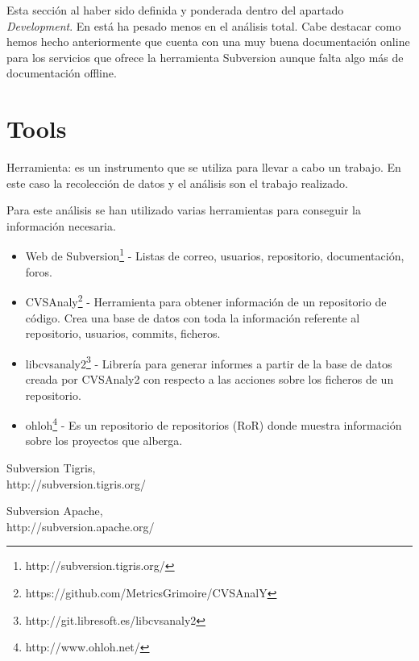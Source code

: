\documentclass[11pt]{scrartcl}
\begin{document}
\par Esta secci\'on al haber sido definida y ponderada dentro del apartado \emph{Development}. En est\'a ha pesado menos en el an\'alisis total. Cabe destacar como hemos hecho anteriormente que cuenta con una muy buena documentaci\'on online para los servicios que ofrece la herramienta Subversion aunque falta algo m\'as de documentaci\'on offline.

\section{Tools}

\par Herramienta: es un instrumento que se utiliza para llevar a cabo un trabajo. En este caso la recolecci\'on de datos y el an\'alisis son el trabajo realizado.

\par Para este an\'alisis se han utilizado varias herramientas para conseguir la informaci\'on necesaria.

\begin{itemize}
    \item Web de Subversion\footnote{http://subversion.tigris.org/} - Listas de correo, usuarios, repositorio, documentaci\'on, foros.
    \item CVSAnaly\footnote{https://github.com/MetricsGrimoire/CVSAnalY} - Herramienta para obtener informaci\'on de un repositorio de c\'odigo. Crea una base de datos con toda la informaci\'on referente al repositorio, usuarios, commits, ficheros.
    \item libcvsanaly2\footnote{http://git.libresoft.es/libcvsanaly2} - Librer\'ia para generar informes a partir de la base de datos creada por CVSAnaly2 con respecto a las acciones sobre los ficheros de un repositorio.
    \item ohloh\footnote{http://www.ohloh.net/} - Es un repositorio de repositorios (RoR) donde muestra informaci\'on sobre los proyectos que alberga.

\end{itemize}

\begin{thebibliography}{9}

  Subversion Tigris,\\
  http://subversion.tigris.org/

  Subversion Apache,\\
  http://subversion.apache.org/

\end{thebibliography}
\end{document}
